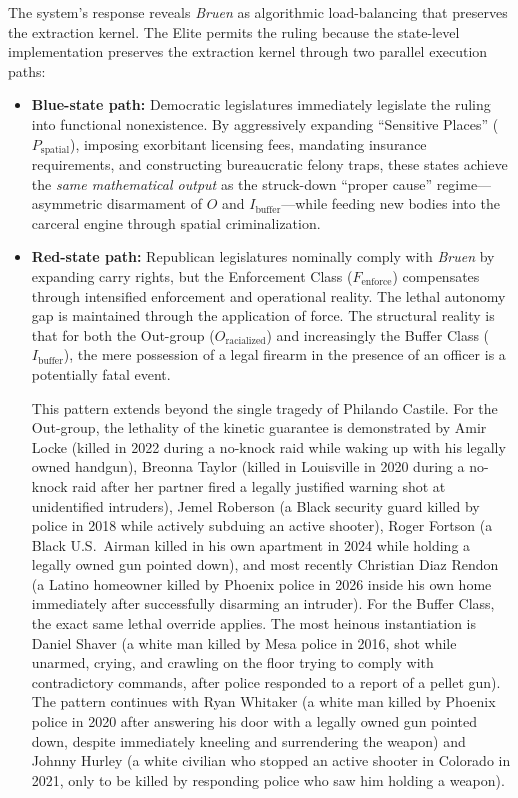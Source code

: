 The system's response reveals \textit{Bruen} as algorithmic load-balancing that preserves the extraction kernel. The Elite permits the ruling because the state-level implementation preserves the extraction kernel through two parallel execution paths:

\begin{itemize}
    \item \textbf{Blue-state path:} Democratic legislatures immediately legislate the ruling into functional nonexistence. By aggressively expanding ``Sensitive Places'' ($P_{\text{spatial}}$), imposing exorbitant licensing fees, mandating insurance requirements, and constructing bureaucratic felony traps, these states achieve the \textit{same mathematical output} as the struck-down ``proper cause'' regime---asymmetric disarmament of $O$ and $I_{\text{buffer}}$---while feeding new bodies into the carceral engine through spatial criminalization.

    \item \textbf{Red-state path:} Republican legislatures nominally comply with \textit{Bruen} by expanding carry rights, but the Enforcement Class ($F_{\text{enforce}}$) compensates through intensified enforcement and operational reality. The lethal autonomy gap is maintained through the application of force. The structural reality is that for both the Out-group ($O_{\text{racialized}}$) and increasingly the Buffer Class ($I_{\text{buffer}}$), the mere possession of a legal firearm in the presence of an officer is a potentially fatal event.

    This pattern extends beyond the single tragedy of Philando Castile. For the Out-group, the lethality of the kinetic guarantee is demonstrated by Amir Locke (killed in 2022 during a no-knock raid while waking up with his legally owned handgun), Breonna Taylor (killed in Louisville in 2020 during a no-knock raid after her partner fired a legally justified warning shot at unidentified intruders), Jemel Roberson (a Black security guard killed by police in 2018 while actively subduing an active shooter), Roger Fortson (a Black U.S.\ Airman killed in his own apartment in 2024 while holding a legally owned gun pointed down), and most recently Christian Diaz Rendon (a Latino homeowner killed by Phoenix police in 2026 inside his own home immediately after successfully disarming an intruder). For the Buffer Class, the exact same lethal override applies. The most heinous instantiation is Daniel Shaver (a white man killed by Mesa police in 2016, shot while unarmed, crying, and crawling on the floor trying to comply with contradictory commands, after police responded to a report of a pellet gun). The pattern continues with Ryan Whitaker (a white man killed by Phoenix police in 2020 after answering his door with a legally owned gun pointed down, despite immediately kneeling and surrendering the weapon) and Johnny Hurley (a white civilian who stopped an active shooter in Colorado in 2021, only to be killed by responding police who saw him holding a weapon).


\end{itemize}
